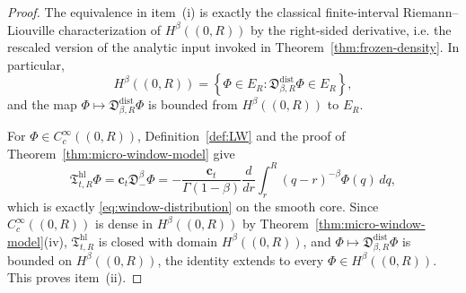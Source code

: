 \documentclass[11pt,a4paper]{amsart}
\theoremstyle{plain}
\theoremstyle{definition}
\theoremstyle{remark}
\begin{document}
\begin{proof}
The equivalence in item~(i) is exactly the classical finite-interval Riemann--Liouville
characterization of \(H^\beta((0,R))\) by the right-sided derivative, i.e. the rescaled version of
the analytic input invoked in Theorem~\ref{thm:frozen-density}. In particular,
\[
H^\beta((0,R))
=
\left\{
\Phi\in E_R:
\mathfrak D_{\beta,R}^{\mathrm{dist}}\Phi\in E_R
\right\},
\]
and the map \(\Phi\mapsto \mathfrak D_{\beta,R}^{\mathrm{dist}}\Phi\) is bounded from
\(H^\beta((0,R))\) to \(E_R\).

For \(\Phi\in C_c^\infty((0,R))\), Definition~\ref{def:LW} and the proof of
Theorem~\ref{thm:micro-window-model} give
\[
\mathfrak T_{t,R}^{\mathrm{hl}}\Phi
=
\mathbf c_t \mathfrak D_-^\beta \Phi
=
-\frac{\mathbf c_t}{\Gamma(1-\beta)}
\frac{d}{dr}
\int_r^R (q-r)^{-\beta}\Phi(q)\,dq,
\]
which is exactly \eqref{eq:window-distribution} on the smooth core. Since
\(C_c^\infty((0,R))\) is dense in \(H^\beta((0,R))\) by Theorem~\ref{thm:micro-window-model}(iv),
\(\mathfrak T_{t,R}^{\mathrm{hl}}\) is closed with domain \(H^\beta((0,R))\), and
\(\Phi\mapsto \mathfrak D_{\beta,R}^{\mathrm{dist}}\Phi\) is bounded on \(H^\beta((0,R))\), the
identity extends to every \(\Phi\in H^\beta((0,R))\). This proves item~(ii).
\end{proof}
\end{document}

